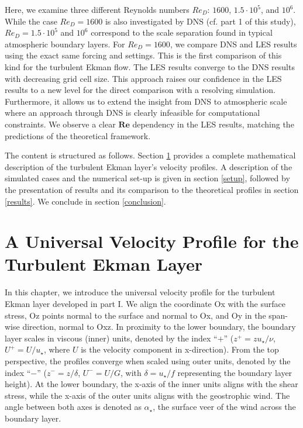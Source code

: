 \documentclass[a4paper,11pt]{article}
\newcommand{\RE}{\mathbf{Re}}
\begin{document}
Here, we examine three different Reynolds numbers $Re_D$: $1600$, $1.5\cdot10^5$, and $10^6$. While the case $Re_D=1600$ is also investigated by DNS (cf. part 1 of this study), $Re_D=1.5 \cdot 10^5$ and $10^6$ correspond to the scale separation found in typical atmospheric boundary layers. For $Re_D=1600$, we compare DNS and LES results using the exact same forcing and settings. This is the first comparison of this kind for the turbulent Ekman flow. The LES results converge to the DNS results with decreasing grid cell size. This approach raises our confidence in the LES results to a new level for the direct comparison with a resolving simulation. Furthermore, it allows us to extend the insight from DNS to atmospheric scale where an approach through DNS is clearly infeasible for computational constraints. We observe a clear $\RE$ dependency in the LES results, matching the predictions of the theoretical framework.

The content is structured as follows. Section \ref{universal_profile} provides a complete mathematical description of the turbulent Ekman layer's velocity profiles. A description of the simulated cases and the numerical set-up is given in section \ref{setup}, followed by the presentation of results and its comparison to the theoretical profiles in section \ref{results}. We conclude in section \ref{conclusion}.

\section{A Universal Velocity Profile for the Turbulent Ekman Layer}
\label{universal_profile}

In this chapter, we introduce the universal velocity profile for the turbulent Ekman layer developed in part I. 
We align the coordinate Ox with the surface stress, Oz points normal to the surface and normal to Ox, and Oy in the span-wise direction, normal to Oxz.
In proximity to the lower boundary, the boundary layer scales in viscous (inner) units, denoted by the index ``$+$'' ($z^+ = zu_\star/\nu$, $U^+=U/u_\star$, where $U$ is the velocity component in x-direction). From the top perspective, the profiles converge when scaled using outer units, denoted by the index ``$-$'' ($z^-=z/\delta$, $U^-=U/G$, with $\delta=u_\star/f$ representing the boundary layer height). 
At the lower boundary, the x-axis of the inner units aligns with the shear stress, while the x-axis of the outer units aligns with the geostrophic wind. The angle between both axes is denoted as $\alpha_\star$, the surface veer of the wind across the boundary layer.
\end{document}
